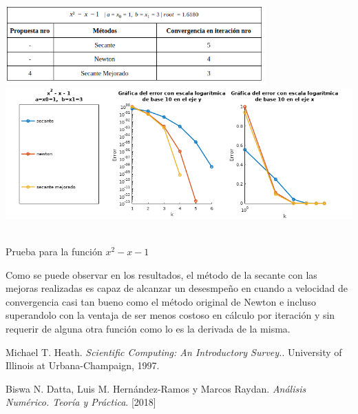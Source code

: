 \documentclass[11pt]{article}
\begin{document}
\begin{center}
    \includegraphics[keepaspectratio, width=10cm]{T3.png}
    \vspace{0.5cm}
    \includegraphics[keepaspectratio, width=14cm]{CL3.png}
    \caption \tiny{\\ Prueba para la función $x^2 - x - 1$}
\end{center} 
\vspace{0.75cm}    

Como se puede observar en los resultados, el método de la secante con las mejoras realizadas es capaz de alcanzar un desesmpeño en cuando a velocidad de convergencia casi tan bueno como el método original de Newton e incluso superandolo con la ventaja de ser menos costoso en cálculo por iteración y sin requerir de alguna otra función como lo es la derivada de la misma.


\begin{thebibliography}{9}
Michael T. Heath. 
\textit{Scientific Computing: An Introductory Survey.}. 
University of Illinois at Urbana-Champaign, 1997.

Biswa N. Datta, Luis M. Hernández-Ramos y Marcos Raydan.
\textit{Análisis Numérico. Teoría y Práctica}. 
[2018]


\end{thebibliography}
\end{document}
